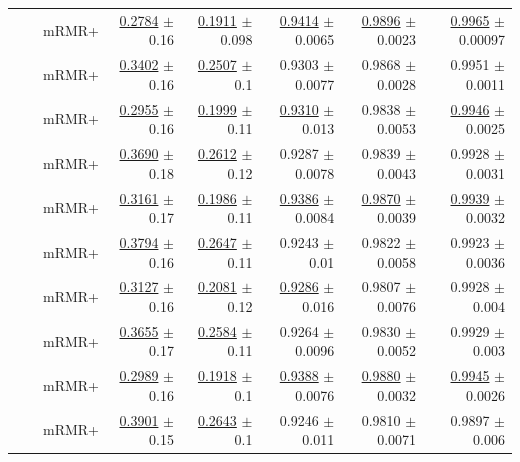 \begin{longtable}{llp{}rrrrr}
 &  & mRMR+ & \underline{0.2784} {\scriptsize $\pm$ 0.16} & \underline{0.1911} {\scriptsize $\pm$ 0.098} & \underline{0.9414} {\scriptsize $\pm$ 0.0065} & \underline{0.9896} {\scriptsize $\pm$ 0.0023} & \underline{0.9965} {\scriptsize $\pm$ 0.00097} \\
 &  & mRMR+ & \underline{0.3402} {\scriptsize $\pm$ 0.16} & \underline{0.2507} {\scriptsize $\pm$ 0.1} & 0.9303 {\scriptsize $\pm$ 0.0077} & 0.9868 {\scriptsize $\pm$ 0.0028} & 0.9951 {\scriptsize $\pm$ 0.0011} \\
 &  & mRMR+ & \underline{0.2955} {\scriptsize $\pm$ 0.16} & \underline{0.1999} {\scriptsize $\pm$ 0.11} & \underline{0.9310} {\scriptsize $\pm$ 0.013} & 0.9838 {\scriptsize $\pm$ 0.0053} & \underline{0.9946} {\scriptsize $\pm$ 0.0025} \\
 &  & mRMR+ & \underline{0.3690} {\scriptsize $\pm$ 0.18} & \underline{0.2612} {\scriptsize $\pm$ 0.12} & 0.9287 {\scriptsize $\pm$ 0.0078} & 0.9839 {\scriptsize $\pm$ 0.0043} & 0.9928 {\scriptsize $\pm$ 0.0031} \\
 &  & mRMR+ & \underline{0.3161} {\scriptsize $\pm$ 0.17} & \underline{0.1986} {\scriptsize $\pm$ 0.11} & \underline{0.9386} {\scriptsize $\pm$ 0.0084} & \underline{0.9870} {\scriptsize $\pm$ 0.0039} & \underline{0.9939} {\scriptsize $\pm$ 0.0032} \\
 &  & mRMR+ & \underline{0.3794} {\scriptsize $\pm$ 0.16} & \underline{0.2647} {\scriptsize $\pm$ 0.11} & 0.9243 {\scriptsize $\pm$ 0.01} & 0.9822 {\scriptsize $\pm$ 0.0058} & 0.9923 {\scriptsize $\pm$ 0.0036} \\
 &  & mRMR+ & \underline{0.3127} {\scriptsize $\pm$ 0.16} & \underline{0.2081} {\scriptsize $\pm$ 0.12} & \underline{0.9286} {\scriptsize $\pm$ 0.016} & 0.9807 {\scriptsize $\pm$ 0.0076} & 0.9928 {\scriptsize $\pm$ 0.004} \\
 &  & mRMR+ & \underline{0.3655} {\scriptsize $\pm$ 0.17} & \underline{0.2584} {\scriptsize $\pm$ 0.11} & 0.9264 {\scriptsize $\pm$ 0.0096} & 0.9830 {\scriptsize $\pm$ 0.0052} & 0.9929 {\scriptsize $\pm$ 0.003} \\
 &  & mRMR+ & \underline{0.2989} {\scriptsize $\pm$ 0.16} & \underline{0.1918} {\scriptsize $\pm$ 0.1} & \underline{0.9388} {\scriptsize $\pm$ 0.0076} & \underline{0.9880} {\scriptsize $\pm$ 0.0032} & \underline{0.9945} {\scriptsize $\pm$ 0.0026} \\
 &  & mRMR+ & \underline{0.3901} {\scriptsize $\pm$ 0.15} & \underline{0.2643} {\scriptsize $\pm$ 0.1} & 0.9246 {\scriptsize $\pm$ 0.011} & 0.9810 {\scriptsize $\pm$ 0.0071} & 0.9897 {\scriptsize $\pm$ 0.006} \\

\end{longtable}
